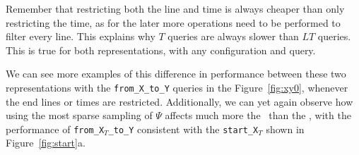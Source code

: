     Remember that restricting both the line and time is always cheaper than only restricting the time, as for the later more operations need to be performed to filter every line. This explains why $T$ queries are always slower than $LT$ queries. This is true for both representations, with any configuration and query.
    
    We can see more examples of this difference in performance between these two representations with the \texttt{from\_X\_to\_Y} queries in the Figure~\ref{fig:xy0}, whenever the end lines or times are restricted. Additionally, we can yet again observe how using the most sparse sampling of $\Psi$ affects much more the \ttctr~than the \ctr, with the performance of \texttt{from\_X$_{T}$\_to\_Y} consistent with the \texttt{start\_X$_T$} shown in Figure~\ref{fig:start}a.
    
